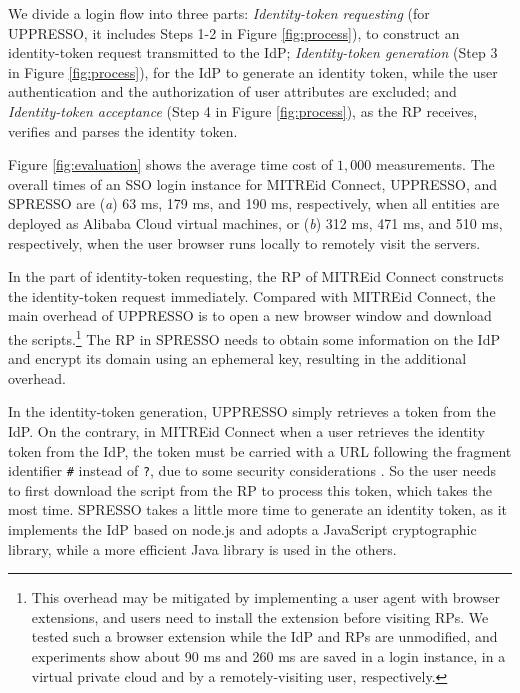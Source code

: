 We divide a login flow into three parts:
{\em Identity-token requesting} (for UPPRESSO, it includes Steps 1-2 in Figure \ref{fig:process}),
  to construct an identity-token request transmitted to the IdP;
{\em Identity-token generation} (Step 3 in Figure \ref{fig:process}),
    for the IdP to generate an identity token, while the user authentication and  the authorization of user attributes are excluded;
and {\em Identity-token acceptance} (Step 4 in Figure \ref{fig:process}),
    as the RP receives, verifies and parses the identity token.


Figure \ref{fig:evaluation} shows
        the average time cost of $1,000$ measurements.
The overall times of an SSO login instance for MITREid Connect, UPPRESSO, and SPRESSO are
 (\emph{a}) 63 ms, 179 ms, and 190 ms, respectively, when all entities are deployed as Alibaba Cloud virtual machines,
or
 (\emph{b})
312 ms, 471 ms, and 510 ms, respectively, when the user browser runs locally to remotely visit the servers.

In the part of identity-token requesting, %
the RP of MITREid Connect constructs the identity-token request immediately.
Compared with MITREid Connect, the main overhead of UPPRESSO is to open a new browser window and download the scripts.\footnote{This overhead may be mitigated %
    by implementing a user agent with browser extensions,
and users need to install the extension
    before visiting RPs.
We tested such a browser extension while the IdP and RPs are unmodified,
and experiments show about 90 ms and 260 ms are saved in a login instance,
    in a virtual private cloud and by a remotely-visiting user, respectively.}
The RP in SPRESSO needs  to obtain some information on the IdP  %
     and encrypt its domain using an ephemeral key, resulting in the additional overhead.




In the identity-token generation,
UPPRESSO simply retrieves a token from the IdP.
On the contrary, in MITREid Connect when a user retrieves the identity token from the IdP,
 the token must be carried with a URL following the fragment identifier \verb+#+ instead of \verb+?+, due to some security considerations \cite{de2014oauth}.
So the user needs to first download the script from the RP to process this token, which takes the most time.
SPRESSO takes a little more time to generate an identity token,
    as it implements the IdP based on node.js and adopts a JavaScript cryptographic library,
 while a more efficient Java library is used in the others.


